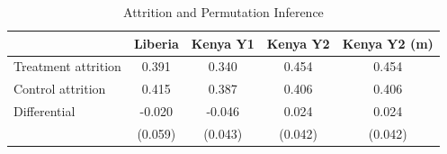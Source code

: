 \begin{table}[htbp]
\centering
\small
\caption{Attrition and Permutation Inference}
\label{tab:attrition_perm}
\begin{tabular}{l*{4}{c}}
\toprule
 & Liberia & Kenya Y1 & Kenya Y2 & Kenya Y2 (m) \\
\midrule
Treatment attrition & 0.391 & 0.340 & 0.454 & 0.454 \\
Control attrition & 0.415 & 0.387 & 0.406 & 0.406 \\
Differential & -0.020 & -0.046 & 0.024 & 0.024 \\
 & (0.059) & (0.043) & (0.042) & (0.042) \\
\bottomrule
\end{tabular}
\end{table}
